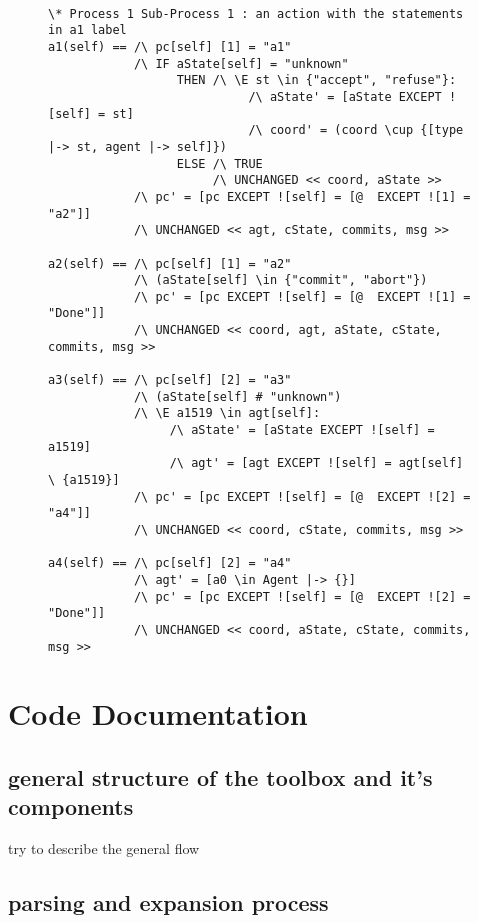 \documentclass{thesul}
\begin{document}
\begin{enumerate}
\FloatBarrier
\begin{figure}
\begin{lstlisting}[caption = TLA+ translation for Sub-Processes, frame = tlrb, firstnumber = 1]

\* Process 1 Sub-Process 1 : an action with the statements in a1 label
a1(self) == /\ pc[self] [1] = "a1"
            /\ IF aState[self] = "unknown"
                  THEN /\ \E st \in {"accept", "refuse"}:
                            /\ aState' = [aState EXCEPT ![self] = st]
                            /\ coord' = (coord \cup {[type |-> st, agent |-> self]})
                  ELSE /\ TRUE
                       /\ UNCHANGED << coord, aState >>
            /\ pc' = [pc EXCEPT ![self] = [@  EXCEPT ![1] = "a2"]]
            /\ UNCHANGED << agt, cState, commits, msg >>

a2(self) == /\ pc[self] [1] = "a2"
            /\ (aState[self] \in {"commit", "abort"})
            /\ pc' = [pc EXCEPT ![self] = [@  EXCEPT ![1] = "Done"]]
            /\ UNCHANGED << coord, agt, aState, cState, commits, msg >>

a3(self) == /\ pc[self] [2] = "a3"
            /\ (aState[self] # "unknown")
            /\ \E a1519 \in agt[self]:
                 /\ aState' = [aState EXCEPT ![self] = a1519]
                 /\ agt' = [agt EXCEPT ![self] = agt[self] \ {a1519}]
            /\ pc' = [pc EXCEPT ![self] = [@  EXCEPT ![2] = "a4"]]
            /\ UNCHANGED << coord, cState, commits, msg >>

a4(self) == /\ pc[self] [2] = "a4"
            /\ agt' = [a0 \in Agent |-> {}]
            /\ pc' = [pc EXCEPT ![self] = [@  EXCEPT ![2] = "Done"]]
            /\ UNCHANGED << coord, aState, cState, commits, msg >>
\end{lstlisting}
\end{figure}
\FloatBarrier

\end{enumerate}

\chapter{Code Documentation}

\section{general structure of the toolbox and it's components}
try to describe the general flow

\section{parsing and expansion process}
\end{document}
